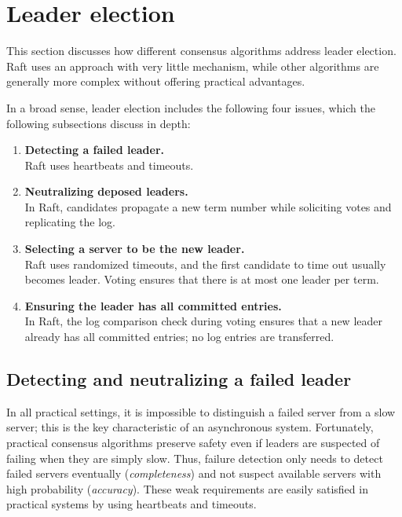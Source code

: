 \section{Leader election}
\label{related:leaderelection}

This section discusses how different consensus algorithms address leader
election. Raft uses an approach with very little mechanism, while other
algorithms are generally more complex without offering practical
advantages.

In a broad sense, leader election includes the following four issues,
which the following subsections discuss in depth:
%
\begin{enumerate}
%
\item \textbf{Detecting a failed leader.}\\
%
Raft uses heartbeats and timeouts.
%
\item \textbf{Neutralizing deposed leaders.}\\
%
In Raft, candidates propagate a new term number while soliciting votes
and replicating the log.
%
\item \textbf{Selecting a server to be the new leader.}\\
%
Raft uses randomized timeouts, and the first candidate to time out
usually becomes leader. Voting ensures that there is at most one leader
per term.
%
\item \textbf{Ensuring the leader has all committed entries.}\\
%
In Raft, the log comparison check during voting ensures that a new
leader already has all committed entries; no log entries are
transferred.
%
\end{enumerate}

\subsection{Detecting and neutralizing a failed leader}

In all practical settings, it is impossible to distinguish a failed server from a
slow server; this is the key characteristic of an asynchronous system.
Fortunately, practical consensus algorithms preserve safety even if
leaders are suspected of failing when they are simply slow. Thus,
failure detection only needs to detect failed servers eventually
(\emph{completeness}) and not suspect available servers with high
probability (\emph{accuracy}). These weak requirements are easily
satisfied in practical systems by using heartbeats and timeouts.

